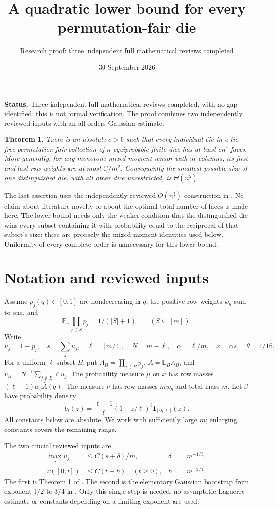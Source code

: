 \documentclass[11pt]{article}
\title{A quadratic lower bound for every permutation-fair die}
\author{Research proof: three independent full mathematical reviews completed}
\date{30 September 2026}
\newtheorem{theorem}{Theorem}
\newcommand{\E}{\mathbb E}
\begin{document}
\maketitle
\noindent\textbf{Status.} Three independent full mathematical reviews
completed, with no gap identified; this is not formal verification.
The proof combines two independently reviewed inputs with an
all-orders Gaussian estimate.

\begin{theorem}\label{main}
There is an absolute $c>0$ such that every individual die in a tie-free
permutation-fair collection of $n$ equiprobable finite dice has at least
$cn^2$ faces. More generally, for any monotone mixed-moment tensor with
$m$ columns, its first and last row weights are at most $C/m^2$.
Consequently the smallest possible size of one distinguished die,
with all other dice unrestricted, is $\Theta(n^2)$.
\end{theorem}
The last assertion uses the independently reviewed $O(n^2)$ construction
in . No claim about literature
novelty or about the optimal total number of faces is made here.
The lower bound needs only the weaker condition that the distinguished
die wins every subset containing it with probability equal to the
reciprocal of that subset's size: these are precisely the mixed-moment
identities used below. Uniformity of every complete order is unnecessary
for this lower bound.

\section*{Notation and reviewed inputs}
Assume $p_j(q)\in[0,1]$ are nondecreasing in $q$, the positive row weights
$w_q$ sum to one, and
\[
 \E_w\prod_{j\in S}p_j=1/(|S|+1)\qquad(S\subseteq[m]).
\]
Write
\[
 u_j=1-p_j,\quad s=\sum_j u_j,\quad
 \ell=\lfloor m/4\rfloor,\quad N=m-\ell,\quad
 \alpha=\ell/m,\quad x=\alpha s,\quad\theta=1/16.
\]
For a uniform $\ell$-subset $B$, put
$A_B=\prod_{j\in B}p_j$, $\bar A=\E_B A_B$, and
$v_B=N^{-1}\sum_{j\notin B}\ell u_j$.
The probability measure $\mu$ on $x$ has row masses
$(\ell+1)w_q\bar A(q)$. The measure $\nu$ has row masses $mw_q$ and
total mass $m$. Let $\beta$ have probability density
\[
 b_\ell(z)=\frac{\ell+1}{\ell}(1-z/\ell)^\ell
                         \boldsymbol1_{[0,\ell]}(z).
\]
All constants below are absolute. We work with sufficiently large $m$;
enlarging constants covers the remaining range.

The two crucial reviewed inputs are
\begin{align}
 \max_j u_j&\le C(s+\delta)/m,
       &\delta&=m^{-1/3},\label{relative}\\
 \nu([0,t])&\le C(t+h)\quad(t\ge0),
       &h&=m^{-3/4}.\label{cdf}
\end{align}
The first is Theorem 1 of
.
The second is the elementary Gaussian bootstrap from exponent $1/2$
to $3/4$ in .
Only this single step is needed; no asymptotic Laguerre estimate or
constants depending on a limiting exponent are used.
\end{document}

